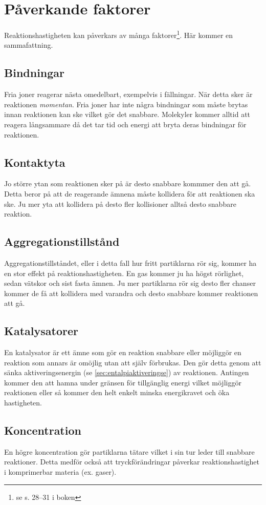 \section{Påverkande faktorer}
Reaktionshastigheten kan påverkars av många faktorer\footnote{se s. 28--31 i boken}. Här kommer en sammafattning.
\subsection{Bindningar}
Fria joner reagerar nästa omedelbart, exempelvis i fällningar. När detta sker är reaktionen \emph{momentan}. Fria joner har inte några bindningar som måste brytas innan reaktionen kan ske vilket gör det snabbare. Molekyler kommer alltid att reagera långsammare då det tar tid och energi att bryta deras bindningar för reaktionen.

\subsection{Kontaktyta}
Jo större ytan som reaktionen sker på är desto snabbare kommmer den att gå. Detta beror på att de reagerande ämnena måste kollidera för att reaktionen ska ske. Ju mer yta att kollidera på desto fler kollisioner alltså desto snabbare reaktion.

\subsection{Aggregationstillstånd}
Aggregationstillståndet, eller i detta fall hur fritt partiklarna rör sig, kommer ha en stor effekt på reaktionshastigheten. En gas kommer ju ha högst rörlighet, sedan vätskor och sist fasta ämnen. Ju mer partiklarna rör sig desto fler chanser kommer de få att kollidera med varandra och desto snabbare kommer reaktionen att gå.

\subsection{Katalysatorer}
\label{sec:katalysator}
En katalysator är ett ämne som gör en reaktion snabbare eller möjliggör en reaktion som annars är omöjlig utan att själv förbrukas. Den gör detta genom att sänka aktiveringsenergin (se \vref{sec:entalpiaktiveringse}) av reaktionen. Antingen kommer den att hamna under gränsen för tillgänglig energi vilket möjliggör reaktionen eller så kommer den helt enkelt minska energikravet och öka hastigheten.

\subsection{Koncentration}
En högre koncentration gör partiklarna tätare vilket i sin tur leder till snabbare reaktioner. Detta medför också att tryckförändringar påverkar reaktionshastighet i komprimerbar materia (ex. gaser).

